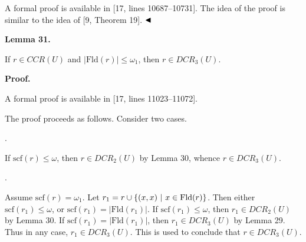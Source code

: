  
A formal proof is available in [17, lines 10687–10731]. The idea of the proof is similar to the idea of [9, Theorem 19]. $\hfill\blacktriangleleft$\par
 
 
 
\par\medskip\noindent\textbf{Lemma 31.}\par
 
 
If $r\in CCR(U)$ and $|\mathrm{Fld}(r)|\leq\omega_{1}$, then $r\in DCR_{3}(U)$.\par
 
 
 
 
 
\par\medskip\noindent\textbf{Proof.}\par
 
 
A formal proof is available in [17, lines 11023–11072].\par
 
 
 
The proof proceeds as follows. Consider two cases.\par
  
\par{}. 
 
If $\mathrm{scf}(r)\leq\omega$, then $r\in DCR_{2}(U)$ by Lemma 30, whence $r\in DCR_{3}(U)$.\par
 
 
 
\par{}. 
 
Assume $\mathrm{scf}(r)=\omega_{1}$. Let $r_{1}=r\cup\{(x,x)\leavevmode\nobreak\ |\leavevmode\nobreak\ x\in\mathrm{Fld}(%
r)\}$. Then either $\mathrm{scf}(r_{1})\leq\omega$, or $\mathrm{scf}(r_{1})=|\mathrm{Fld}(r_{1})|$. If $\mathrm{scf}(r_{1})\leq\omega$, then $r_{1}\in DCR_{2}(U)$ by Lemma 30. If $\mathrm{scf}(r_{1})=|\mathrm{Fld}(r_{1})|$, then $r_{1}\in DCR_{3}(U)$ by Lemma 29. Thus in any case, $r_{1}\in DCR_{3}(U)$. This is used to conclude that $r\in DCR_{3}(U)$.\par
 
